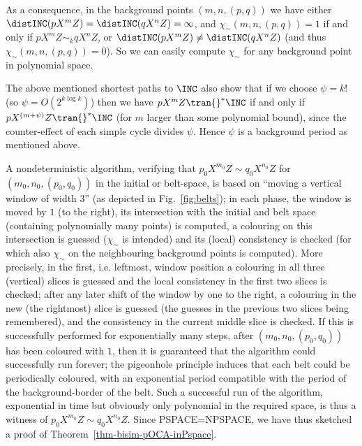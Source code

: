 As a consequence, in the background points $(m,n,(p,q))$
we have either $\distINC(pX^{m}Z)=\distINC(qX^{n}Z)=\infty$,
and $\chi_{\sim}(m,n,(p,q))=1$ if and only if $pX^{m}Z\sim_k qX^{n}Z$,
or $\distINC(pX^{m}Z)\neq\distINC(qX^{n}Z)$
(and thus  $\chi_{\sim}(m,n,(p,q))=0$).
So we can easily compute $\chi_{\sim}$ for any background point in
polynomial space.

The above mentioned shortest paths to $\INC$ also show that
if we choose $\psi=k!$ (so $\psi=O(2^{k\log k})$) then
we have
$pX^{m}Z\tran{}^* \INC$ if and only if $pX^{(m+\psi)}Z\tran{}^*\INC$ (for $m$ larger than
some polynomial bound), since the counter-effect of each simple cycle
divides $\psi$.
Hence
$\psi$ is a background period as mentioned above.

A nondeterministic algorithm, verifying that $p_0X^{m_0}Z\sim
q_0X^{n_0}Z$ for  $(m_0,n_0,(p_0,q_0))$ in the initial or belt-space,
is based on ``moving a
vertical window of width $3$'' (as depicted in Fig.~\ref{fig:belts});
in each phase, the window is moved by $1$ (to the right),
its intersection with the initial and belt space
(containing polynomially many
points) is computed, a colouring
on this intersection is guessed
 ($\chi_{\sim}$ is intended)
and its (local) consistency is
checked (for which also $\chi_{\sim}$
on the neighbouring background points is computed).
More precisely, in the first, i.e. leftmost, window position a
colouring in all
three (vertical) slices is guessed and the local consistency in the first two
slices is checked; after any later shift of the window
by one to the right, a colouring in
the new (the rightmost) slice is
guessed (the guesses in the previous two slices being remembered), and
the consistency in the current middle slice is checked.
If this is successfully performed
for exponentially many steps,
after $(m_0,n_0,(p_0,q_0))$ has been coloured with $1$, then
it is guaranteed that
the algorithm could successfully run forever; the pigeonhole principle
induces that each belt could be periodically coloured, with an
exponential period compatible with the period of the background-border
of the belt.
Such a successful run of the algorithm, exponential in time but
obviously only
polynomial in the required space, is thus a witness of $p_0X^{m_0}Z\sim
q_0X^{n_0}Z$. Since PSPACE=NPSPACE, we have thus sketched a proof
 of Theorem~\ref{thm-bisim-pOCA-inPspace}.




